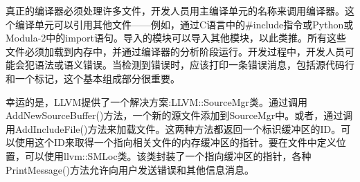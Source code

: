 真正的编译器必须处理许多文件，开发人员用主编译单元的名称来调用编译器。这个编译单元可以引用其他文件——例如，通过C语言中的\#include指令或Python或Modula-2中的import语句。导入的模块可以导入其他模块，以此类推。所有这些文件必须加载到内存中，并通过编译器的分析阶段运行。开发过程中，开发人员可能会犯语法或语义错误。当检测到错误时，应该打印一条错误消息，包括源代码行和一个标记，这个基本组成部分很重要。

幸运的是，LLVM提供了一个解决方案:LLVM::SourceMgr类。通过调用AddNewSourceBuffer()方法，一个新的源文件添加到SourceMgr中。或者，通过调用AddIncludeFile()方法来加载文件。这两种方法都返回一个标识缓冲区的ID。可以使用这个ID来取得一个指向相关文件的内存缓冲区的指针。要在文件中定义位置，可以使用llvm::SMLoc类。该类封装了一个指向缓冲区的指针，各种PrintMessage()方法允许向用户发送错误和其他信息消息。